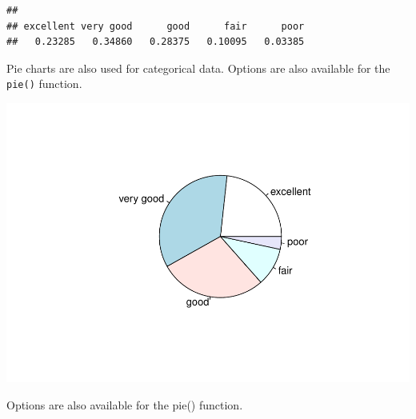 \documentclass[
]{book}
\newenvironment{Shaded}{\begin{snugshade}}{\end{snugshade}}
\newcommand{\DataTypeTok}[1]{\textcolor[rgb]{0.13,0.29,0.53}{#1}}
\newcommand{\DecValTok}[1]{\textcolor[rgb]{0.00,0.00,0.81}{#1}}
\newcommand{\KeywordTok}[1]{\textcolor[rgb]{0.13,0.29,0.53}{\textbf{#1}}}
\newcommand{\NormalTok}[1]{#1}
\newcommand{\OperatorTok}[1]{\textcolor[rgb]{0.81,0.36,0.00}{\textbf{#1}}}
\newcommand{\StringTok}[1]{\textcolor[rgb]{0.31,0.60,0.02}{#1}}
\begin{document}
\begin{verbatim}
## 
## excellent very good      good      fair      poor 
##   0.23285   0.34860   0.28375   0.10095   0.03385
\end{verbatim}

Pie charts are also used for categorical data. Options are also available for the \texttt{pie()} function.

\begin{Shaded}
\end{Shaded}

\includegraphics{_main_files/figure-latex/unnamed-chunk-141-1.pdf}

Options are also available for the pie() function.

\begin{Shaded}
\end{Shaded}
\end{document}

